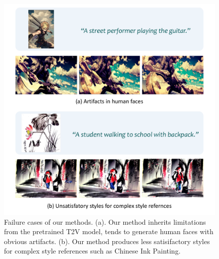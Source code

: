 %
\begin{figure}[!h]
    \centering
    \includegraphics[width=\linewidth]{figures/supp/limit.pdf}
    \caption{Failure cases of our methods. (a). Our method inherits limitations from the pretrained T2V model, tends to generate human faces with obvious artifacts. (b). Our method produces less satisifactory styles for complex style references such as Chinese Ink Painting.} 
    \label{fig:supp_failure}
\end{figure}


